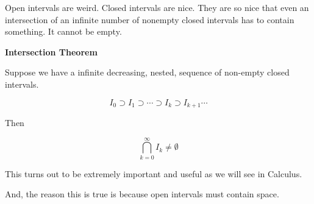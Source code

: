 \documentclass{ximera}
\begin{document}
Open intervals are weird.  Closed intervals are nice.  They are so nice that even an intersection of an infinite number of nonempty closed intervals has to contain something.  It cannot be empty.




\begin{theorem} \textbf{\textcolor{blue!75!black}{Intersection Theorem}}  


Suppose we have a infinite decreasing, nested, sequence of non-empty closed intervals.


\[   I_0 \supset    I_1 \supset  \cdots \supset I_{k}   \supset I_{k+1}  \cdots  \]



Then 


\[   \bigcap_{k=0}^{\infty} I_{k} \ne \emptyset         \]


\end{theorem}













This turns out to be extremely important and useful as we will see in Calculus.


And, the reason this is true is because open intervals must contain space.
\end{document}
